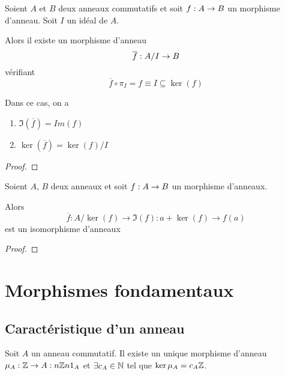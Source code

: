 \begin{proposition}
	Soient $A$ et $B$ deux anneaux commutatifs et soit $f : A \rightarrow B$ un
	morphisme d'anneau.
	Soit $I$ un idéal de $A$.

	Alors il existe un morphisme d'anneau
	\begin{equation}
		\overline{f} : A / I \rightarrow B
	\end{equation}
	vérifiant
	\begin{equation}
		\overline{f} \circ \pi_{I} = f \equiv I \subseteq \ker(f)
	\end{equation}

	Dans ce cas, on a
	\begin{enumerate}
		\item $\Im(\overline{f}) = Im(f)$
		\item $\ker(\overline{f}) = \ker(f) / I$
	\end{enumerate}
\end{proposition}

\ifdefined\outputproof
\begin{proof}

\end{proof}
\fi

\begin{corollary}
	Soient $A$, $B$ deux anneaux et soit $f : A \rightarrow B$ un morphisme
	d'anneaux.

	Alors
	\begin{equation}
		\overline{f} : A / \ker(f) \rightarrow \Im(f) : a + \ker(f) \rightarrow
		f(a)
	\end{equation}
	est un isomorphisme d'anneaux
\end{corollary}

\ifdefined\outputproof
\begin{proof}

\end{proof}
\fi

\section{Morphismes fondamentaux}

\subsection{Caractéristique d'un anneau}
\label{subsection:ring_caracteristic}

\begin{proposition}
	Soit $A$ un anneau commutatif. Il existe un unique morphisme d'anneau
	$\mu_{A} : \mathbb{Z} \rightarrow A : n \mathbb{Z} n 1_{A}$ et $\exists c_{A} \in
	\mathbb{N}$ tel que $\ker{\mu_{A}} = c_{A} \mathbb{Z}$.
\end{proposition}

